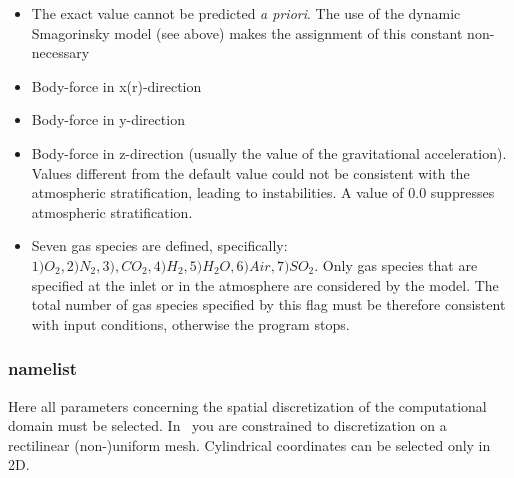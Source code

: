 \begin{itemize}
\item
{}
{The exact value cannot be predicted {\it a priori}. The use of the dynamic
Smagorinsky model (see above) makes the assignment of this constant
non-necessary}

\item
{}
{Body-force in x(r)-direction}

\item
{}
{Body-force in y-direction}

\item
{}
{Body-force in z-direction (usually the value of the gravitational acceleration).
Values different from the default value could not be consistent with the 
atmospheric stratification, leading to instabilities. A value of 0.0 
suppresses atmospheric stratification}.

\item
{}
{Seven gas species are defined, specifically: \\
$ 1) O_2, 2) N_2, 3), CO_2, 4) H_2, 5) H_2O, 6) Air, 7) SO_2$. 
Only gas species that are specified at the inlet or in the
atmosphere are considered by the model. The total number of gas 
species specified by this flag must be therefore consistent with 
input conditions, otherwise the program stops.}

\end{itemize}

\subsubsection{ namelist}
Here all parameters concerning the spatial discretization of the computational
domain must be selected. In \PDAC\ you are constrained to discretization 
on a rectilinear (non-)uniform mesh. Cylindrical coordinates can be
selected only in 2D.

